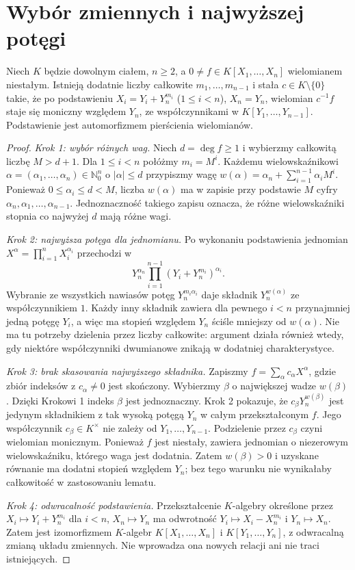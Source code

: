 \section{Wybór zmiennych i najwyższej potęgi}
\begin{lemat}
\label{aa:lem:noether-monic}
Niech $K$ będzie dowolnym ciałem, $n\ge2$,
a $0\ne f\in K[X_1,\ldots,X_n]$ wielomianem niestałym.
Istnieją dodatnie liczby całkowite $m_1,\ldots,m_{n-1}$
i stała $c\in K\setminus\{0\}$ takie, że po podstawieniu
$X_i=Y_i+Y_n^{m_i}$ ($1\le i<n$), $X_n=Y_n$,
wielomian $c^{-1}f$ staje się moniczny względem $Y_n$,
ze współczynnikami w $K[Y_1,\ldots,Y_{n-1}]$.
Podstawienie jest automorfizmem pierścienia wielomianów.
\end{lemat}
\begin{proof}
\emph{Krok 1: wybór różnych wag.}
Niech $d=\deg f\ge1$ i wybierzmy całkowitą liczbę $M>d+1$.
Dla $1\le i<n$ połóżmy $m_i=M^i$. Każdemu
wielowskaźnikowi $\alpha=(\alpha_1,\ldots,\alpha_n)\in\mathbb N_0^n$
o $|\alpha|\le d$ przypiszmy wagę
$w(\alpha)=\alpha_n+\sum_{i=1}^{n-1}\alpha_i M^i$.
Ponieważ $0\le\alpha_i\le d<M$, liczba $w(\alpha)$
ma w zapisie przy podstawie $M$ cyfry
$\alpha_n,\alpha_1,\ldots,\alpha_{n-1}$.
Jednoznaczność takiego zapisu oznacza, że różne
wielowskaźniki stopnia co najwyżej $d$ mają różne wagi.

\emph{Krok 2: najwyższa potęga dla jednomianu.}
Po wykonaniu podstawienia jednomian
$X^\alpha=\prod_{i=1}^n X_i^{\alpha_i}$
przechodzi w
\[
 Y_n^{\alpha_n}\prod_{i=1}^{n-1}
       (Y_i+Y_n^{m_i})^{\alpha_i}.
\]
Wybranie ze wszystkich nawiasów potęg $Y_n^{m_i\alpha_i}$
daje składnik $Y_n^{w(\alpha)}$ ze współczynnikiem $1$.
Każdy inny składnik zawiera dla pewnego $i<n$
przynajmniej jedną potęgę $Y_i$, a więc ma stopień względem
$Y_n$ ściśle mniejszy od $w(\alpha)$.
Nie ma tu potrzeby dzielenia przez liczby całkowite:
argument działa również wtedy, gdy niektóre współczynniki
dwumianowe znikają w dodatniej charakterystyce.

\emph{Krok 3: brak skasowania najwyższego składnika.}
Zapiszmy $f=\sum_{\alpha}c_\alpha X^\alpha$,
gdzie zbiór indeksów z $c_\alpha\ne0$ jest skończony.
Wybierzmy $\beta$ o największej wadze $w(\beta)$.
Dzięki Krokowi 1 indeks $\beta$ jest jednoznaczny.
Krok 2 pokazuje, że $c_\beta Y_n^{w(\beta)}$ jest
jedynym składnikiem z tak wysoką potęgą $Y_n$ w całym
przekształconym $f$. Jego współczynnik $c_\beta\in K^\times$
nie zależy od $Y_1,\ldots,Y_{n-1}$.
Podzielenie przez $c_\beta$ czyni wielomian monicznym.
Ponieważ $f$ jest niestały, zawiera jednomian o niezerowym
wielowskaźniku, którego waga jest dodatnia. Zatem
$w(\beta)>0$ i uzyskane równanie ma dodatni stopień względem $Y_n$;
bez tego warunku nie wynikałaby całkowitość w zastosowaniu lematu.

\emph{Krok 4: odwracalność podstawienia.}
Przekształcenie $K$-algebry określone przez
$X_i\mapsto Y_i+Y_n^{m_i}$ dla $i<n$, $X_n\mapsto Y_n$
ma odwrotność $Y_i\mapsto X_i-X_n^{m_i}$ i $Y_n\mapsto X_n$.
Zatem jest izomorfizmem $K$-algebr $K[X_1,\ldots,X_n]$
i $K[Y_1,\ldots,Y_n]$, z odwracalną zmianą układu zmiennych.
Nie wprowadza ona nowych relacji ani nie traci istniejących.
\end{proof}


